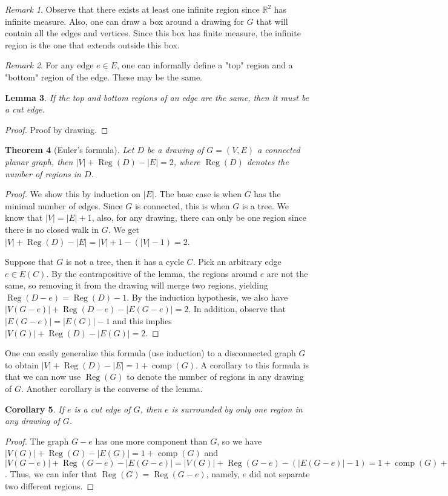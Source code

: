 \documentclass{tufte-handout}
\newtheorem{thm}{Theorem}
\newtheorem{cor}[thm]{Corollary}
\newtheorem{lem}[thm]{Lemma}
\theoremstyle{definition}
\theoremstyle{remark}
\newtheorem{rem}[thm]{Remark}
\newcommand{\R}{\mathbb{R}}
\DeclareMathOperator{\comp}{comp}
\DeclareMathOperator{\reg}{Reg}
\begin{document}
\begin{rem}
	Observe that there exists at least one infinite region since $\R^2$ has infinite measure. Also, one can draw a box around a drawing for $G$ that will contain all the edges and vertices. Since this box has finite measure, the infinite region is the one that extends outside this box.
\end{rem}
\begin{rem}
	For any edge $e \in E$, one can informally define a "top" region and a "bottom" region of the edge. These may be the same.
\end{rem}
\begin{lem}
	If the top and bottom regions of an edge are the same, then it must be a cut edge.
\end{lem}
\begin{proof}
	Proof by drawing.
\end{proof}
\begin{thm}[Euler's formula]
	Let $D$ be a drawing of $G = (V,E)$ a connected planar graph, then $|V| + \reg(D) - |E| = 2$, where $\reg(D)$ denotes the number of regions in $D$.
\end{thm}
\begin{proof}
	We show this by induction on $|E|$. The base case is when $G$ has the minimal number of edges. Since $G$ is connected, this is when $G$ is a tree. We know that $|V| = |E| + 1$, also, for any drawing, there can only be one region since there is no closed walk in $G$. We get $|V| + \reg(D) - |E| = |V| + 1 - (|V| -1) = 2$.
	
	Suppose that $G$ is not a tree, then it has a cycle $C$. Pick an arbitrary edge $e \in E(C)$. By the contrapositive of the lemma, the regions around $e$ are not the same, so removing it from the drawing will merge two regions, yielding $\reg(D-e) = \reg(D) -1$. By the induction hypothesis, we also have $|V(G-e)| + \reg(D-e) - |E(G-e)| = 2$. In addition, observe that $|E(G-e)| = |E(G)| -1$ and this implies $|V(G)| + \reg(D) - |E(G)| = 2$.
\end{proof}
One can easily generalize this formula (use induction) to a disconnected graph $G$ to obtain $|V| + \reg(D) - |E| = 1 + \comp(G)$. A corollary to this formula is that we can now use $\reg(G)$ to denote the number of regions in any drawing of $G$. Another corollary is the converse of the lemma.
\begin{cor}
	If $e$ is a cut edge of $G$, then $e$ is surrounded by only one region in any drawing of $G$.
\end{cor}
\begin{proof}
	The graph $G-e$ has one more component than $G$, so we have $|V(G)| + \reg(G) - |E(G)| = 1 + \comp(G)$ and $|V(G-e)| + \reg(G-e) - |E(G-e)| = |V(G)| + \reg(G-e) - (|E(G-e)| -1) = 1+ \comp(G) + 1$. Thus, we can infer that $\reg(G) = \reg(G-e)$, namely, $e$ did not separate two different regions.
\end{proof}
\end{document}
